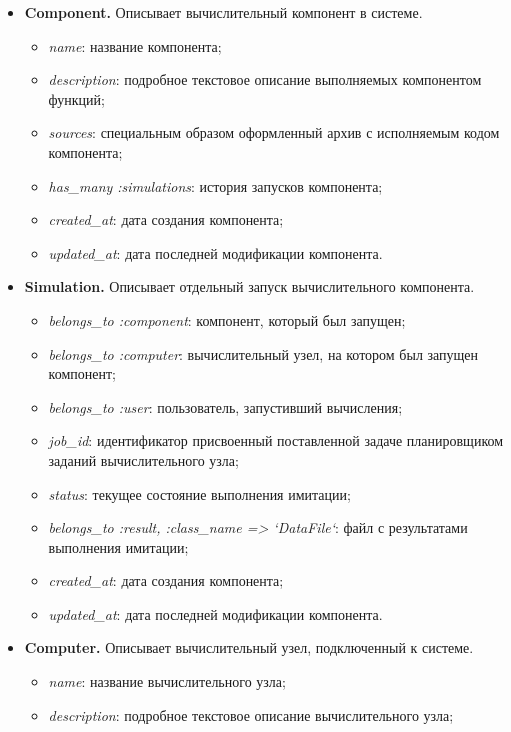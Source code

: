 \begin{itemize}
  \item \textbf{Component.} Описывает вычислительный компонент в системе. 
    \begin{itemize}
      \item \emph{name}: название компонента;
      \item \emph{description}: подробное текстовое описание выполняемых компонентом функций;
      \item \emph{sources}: специальным образом оформленный архив с исполняемым кодом компонента;
      \item \emph{has\_many :simulations}: история запусков компонента;
      \item \emph{created\_at}: дата создания компонента;
      \item \emph{updated\_at}: дата последней модификации компонента.
    \end{itemize}
  \item \textbf{Simulation.} Описывает отдельный запуск вычислительного компонента.
    \begin{itemize}
      \item \emph{belongs\_to :component}: компонент, который был запущен;
      \item \emph{belongs\_to :computer}: вычислительный узел, на котором был запущен компонент;
      \item \emph{belongs\_to :user}: пользователь, запустивший вычисления;
      \item \emph{job\_id}: идентификатор присвоенный поставленной задаче планировщиком заданий вычислительного узла;
      \item \emph{status}: текущее состояние выполнения имитации;
      \item \emph{belongs\_to :result, :class\_name => `DataFile`}: файл с результатами выполнения имитации;
      \item \emph{created\_at}: дата создания компонента;
      \item \emph{updated\_at}: дата последней модификации компонента.
    \end{itemize}
  \item \textbf{Computer.} Описывает вычислительный узел, подключенный к системе.
    \begin{itemize}
      \item \emph{name}: название вычислительного узла;
      \item \emph{description}: подробное текстовое описание вычислительного узла;

\end{itemize}
\end{itemize}
